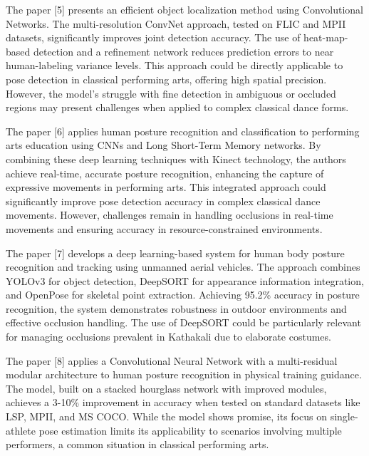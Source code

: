 The paper [5] presents an efficient object localization method using Convolutional Networks. The multi-resolution ConvNet approach, tested on FLIC and MPII datasets, significantly improves joint detection accuracy. The use of heat-map-based detection and a refinement network reduces prediction errors to near human-labeling variance levels. This approach could be directly applicable to pose detection in classical performing arts, offering high spatial precision. However, the model's struggle with fine detection in ambiguous or occluded regions may present challenges when applied to complex classical dance forms.

The paper [6] applies human posture recognition and classification to performing arts education using CNNs and Long Short-Term Memory networks. By combining these deep learning techniques with Kinect technology, the authors achieve real-time, accurate posture recognition, enhancing the capture of expressive movements in performing arts. This integrated approach could significantly improve pose detection accuracy in complex classical dance movements. However, challenges remain in handling occlusions in real-time movements and ensuring accuracy in resource-constrained environments.

The paper [7] develops a deep learning-based system for human body posture recognition and tracking using unmanned aerial vehicles. The approach combines YOLOv3 for object detection, DeepSORT for appearance information integration, and OpenPose for skeletal point extraction. Achieving 95.2\% accuracy in posture recognition, the system demonstrates robustness in outdoor environments and effective occlusion handling. The use of DeepSORT could be particularly relevant for managing occlusions prevalent in Kathakali due to elaborate costumes.

The paper [8] applies a Convolutional Neural Network with a multi-residual modular architecture to human posture recognition in physical training guidance. The model, built on a stacked hourglass network with improved modules, achieves a 3-10\% improvement in accuracy when tested on standard datasets like LSP, MPII, and MS COCO. While the model shows promise, its focus on single-athlete pose estimation limits its applicability to scenarios involving multiple performers, a common situation in classical performing arts.


